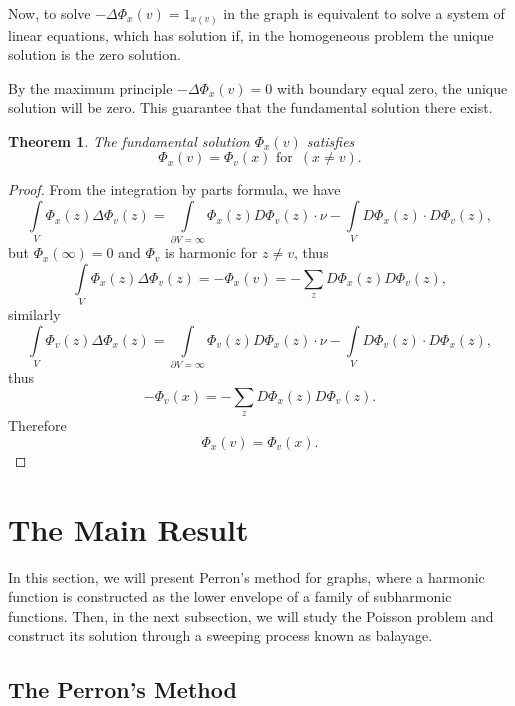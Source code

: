 \documentclass{article}
\newtheorem{theorem}{Theorem}
\begin{document}
 Now, to solve $-\Delta \Phi_x(v)=1_{x(v)}$ in the graph is equivalent to solve a system of linear equations, which has solution if, in the homogeneous problem the unique solution is the zero solution. 
 
 By the maximum principle $-\Delta \Phi_x(v)=0$ with boundary equal zero, the unique solution will be zero. This guarantee that the fundamental solution there exist.
\begin{theorem}
	The fundamental solution $\Phi_x(v)$ satisfies 
	\[
	\Phi_x(v)=\Phi_v(x) \text{ for } \, (x\neq v).
	\]
\end{theorem}
\begin{proof}
	 From the integration by parts formula, we have 
	\[
	\int \limits_{V}\Phi_x(z)\Delta \Phi_v(z)=\int \limits_{\partial V=\infty}\Phi_x(z)D\Phi_v(z)\cdot \nu-\int \limits_{V}D\Phi_x(z)\cdot D\Phi_v(z),
	\]
	but $\Phi_x(\infty)=0$ and $\Phi_v$ is harmonic for $z\neq v$, thus
	\[
	\int \limits_{V}\Phi_x(z)\Delta \Phi_v(z)=-\Phi_x(v)=-\sum \limits_{z}D\Phi_x(z)D\Phi_v(z),
	\]
	similarly
	\[
	\int \limits_{V}\Phi_v(z)\Delta \Phi_x(z)=\int \limits_{\partial V=\infty}\Phi_v(z)D\Phi_x(z)\cdot\nu-\int \limits_{V}D\Phi_v(z)\cdot D\Phi_x(z),
	\]
	thus
	\[
	-\Phi_v(x)=-\sum \limits_{z}D\Phi_x(z)D\Phi_v(z).
	\]
	Therefore
	\[
	\Phi_x(v)=\Phi_v(x).
	\]
	
\end{proof}

\newpage

\section{The Main Result}

In this section, we will present Perron's method for graphs, where a harmonic function is constructed as the lower envelope of a family of subharmonic functions. Then, in the next subsection, we will study the Poisson problem and construct its solution through a sweeping process known as balayage.

\subsection{The Perron's Method}
\end{document}
